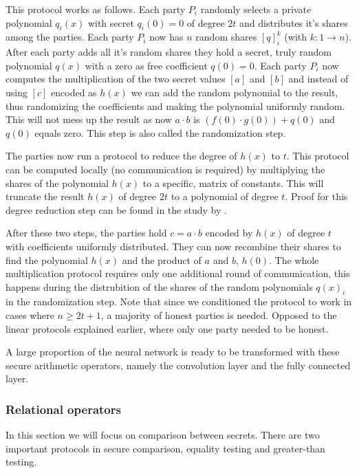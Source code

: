 This protocol works as follows. Each party $P_i$ randomly selects a private polynomial $q_i(x)$ with secret $q_i(0) = 0$ of degree $2t$ and distributes it's shares among the parties. Each party $P_i$ now has $n$ random shares $[q]_i^k$ (with $k: 1 \rightarrow n$). After each party adds all it's random shares they hold a secret, truly random polynomial $q(x)$ with a zero as free coefficient $q(0) = 0$.
Each party $P_i$ now computes the multiplication of the two secret values $[a]$ and $[b]$ and instead of using $[c]$ encoded as $h(x)$ we can add the random polynomial to the result, thus randomizing the coefficients and making the polynomial uniformly random. This will not mess up the result as now $a \cdot b$  is $(f(0) \cdot g(0)) + q(0)$ and $q(0)$ equals zero. This step is also called the randomization step.


The parties now run a protocol to reduce the degree of $h(x)$ to $t$. This protocol can be computed locally (no communication is required) by multiplying the shares of the polynomial $h(x)$ to a specific, matrix of constants. This will truncate the result $h(x)$ of degree $2t$ to a polynomial of degree $t$. Proof for this degree reduction step can be found in the study by \cite{asharov2017full}.


After these two steps, the parties hold $c =a \cdot b$ encoded by $h(x)$ of degree $t$ with coefficients uniformly distributed. They can now recombine their shares to find the polynomial $h(x)$ and the product of $a$ and $b$, $h(0)$. The whole multiplication protocol requires only one additional round of communication, this happens during the distrubition of the shares of the random polynomials $q(x)_i$ in the randomization step. Note that since we conditioned the protocol to work in cases where $n \geq 2t + 1$, a majority of honest parties is needed. Opposed to the linear protocols explained earlier, where only one party needed to be honest.


A large proportion of the neural network is ready to be transformed with these secure arithmetic operators, namely the convolution layer and the fully connected layer.

\subsubsection{Relational operators}
In this section we will focus on comparison between secrets. There are two important protocols in secure comparison, equality testing and greater-than testing.

